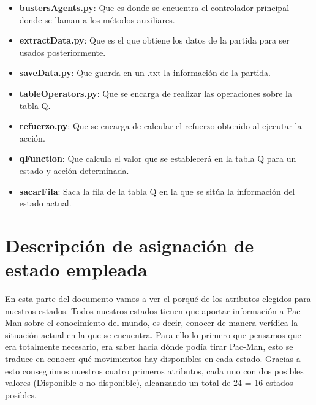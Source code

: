 \documentclass[11pt,a4paper]{article}
\begin{document}
\begin{itemize}

\item\textbf{bustersAgents.py}: Que es donde se encuentra el controlador principal donde se llaman a los métodos auxiliares.

\item\textbf{extractData.py}: Que es el que obtiene los datos de la partida para ser usados posteriormente.

\item\textbf{saveData.py}: Que guarda en un .txt la información de la partida.

\item\textbf{tableOperators.py}: Que se encarga de realizar las operaciones sobre la tabla Q.

\item\textbf{refuerzo.py}: Que se encarga de calcular el refuerzo obtenido al ejecutar la acción.

\item\textbf{qFunction}: Que calcula el valor que se establecerá en la tabla Q para un estado y acción determinada.

\item\textbf{sacarFila}: Saca la fila de la tabla Q en la que se sitúa la información del estado actual.

\end{itemize}



\section{Descripción de asignación de estado empleada}

En esta parte del documento vamos a ver el porqué de los atributos elegidos para nuestros estados.
Todos nuestros estados tienen que aportar información a Pac-Man sobre el conocimiento del mundo, es decir, conocer de manera verídica la situación actual en la que se encuentra. Para ello lo primero que pensamos que era totalmente necesario, era saber hacia dónde podía tirar Pac-Man, esto se traduce en conocer qué movimientos hay disponibles en cada estado. Gracias a esto conseguimos nuestros cuatro primeros atributos, cada uno con dos posibles valores (Disponible o no disponible), alcanzando un total de 24 = 16 estados posibles. 
\end{document}
